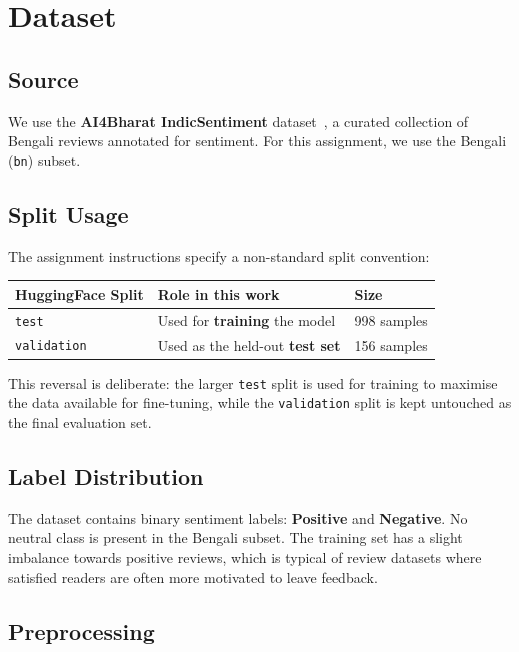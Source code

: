 \documentclass[11pt,a4paper]{article}
\begin{document}
\section{Dataset}

\subsection{Source}

We use the \textbf{AI4Bharat IndicSentiment} dataset~\cite{indicsentiment}, a curated collection of Bengali reviews annotated for sentiment. For this assignment, we use the Bengali (\texttt{bn}) subset.

\subsection{Split Usage}

The assignment instructions specify a non-standard split convention:
\begin{center}
\begin{tabular}{lll}
\toprule
\textbf{HuggingFace Split} & \textbf{Role in this work} & \textbf{Size} \\
\midrule
\texttt{test}       & Used for \textbf{training} the model & 998 samples \\
\texttt{validation} & Used as the held-out \textbf{test set} & 156 samples \\
\bottomrule
\end{tabular}
\end{center}

This reversal is deliberate: the larger \texttt{test} split is used for training to maximise the data available for fine-tuning, while the \texttt{validation} split is kept untouched as the final evaluation set.

\subsection{Label Distribution}

The dataset contains binary sentiment labels: \textbf{Positive} and \textbf{Negative}. No neutral class is present in the Bengali subset. The training set has a slight imbalance towards positive reviews, which is typical of review datasets where satisfied readers are often more motivated to leave feedback.

\subsection{Preprocessing}
\end{document}
